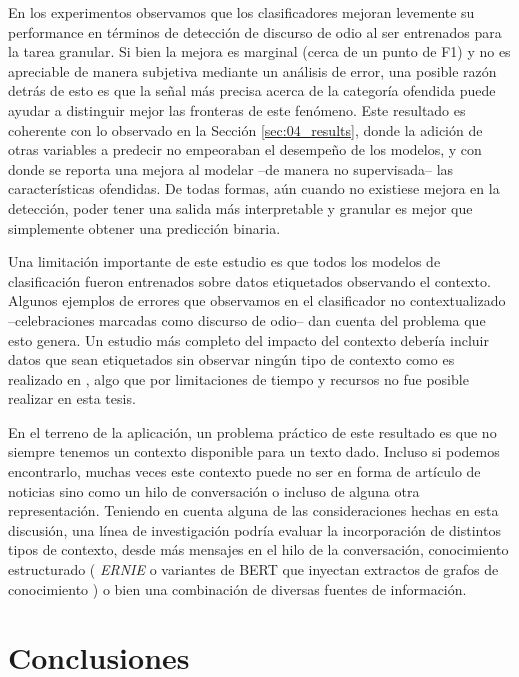 En los experimentos observamos que los clasificadores mejoran levemente su performance en términos de detección de discurso de odio al ser entrenados para la tarea granular. Si bien la mejora es marginal (cerca de un punto de F1) y no es apreciable de manera subjetiva mediante un análisis de error, una posible razón detrás de esto es que la señal más precisa acerca de la categoría ofendida puede ayudar a distinguir mejor las fronteras de este fenómeno. Este resultado es coherente con lo observado en la Sección \ref{sec:04_results}, donde la adición de otras variables a predecir no empeoraban el desempeño de los modelos, y con \citet{gertner-etal-2019-mitre} donde se reporta una mejora al modelar --de manera no supervisada-- las características ofendidas. De todas formas, aún cuando no existiese mejora en la detección, poder tener una salida más interpretable y granular es mejor que simplemente obtener una predicción binaria.

Una limitación importante de este estudio es que todos los modelos de clasificación fueron entrenados sobre datos etiquetados observando el contexto. Algunos ejemplos de errores que observamos en el clasificador no contextualizado --celebraciones marcadas como discurso de odio-- dan cuenta del problema que esto genera. Un estudio más completo del impacto del contexto debería incluir datos que sean etiquetados sin observar ningún tipo de contexto como es realizado en \citet{pavlopoulos2020toxicity}, algo que por limitaciones de tiempo y recursos no fue posible realizar en esta tesis.

En el terreno de la aplicación, un problema práctico de este resultado es que no siempre tenemos un contexto disponible para un texto dado. Incluso si podemos encontrarlo, muchas veces este contexto puede no ser en forma de artículo de noticias sino como un hilo de conversación o incluso de alguna otra representación. Teniendo en cuenta alguna de las consideraciones hechas en esta discusión, una línea de investigación podría evaluar la incorporación de distintos tipos de contexto, desde más mensajes en el hilo de la conversación, conocimiento estructurado ( \emph{ERNIE} \cite{zhang2019ernie} o variantes de BERT que inyectan extractos de grafos de conocimiento \cite{liu2020kbert,faldu2021ki}) o bien una combinación de diversas fuentes de información.

\section{Conclusiones}

